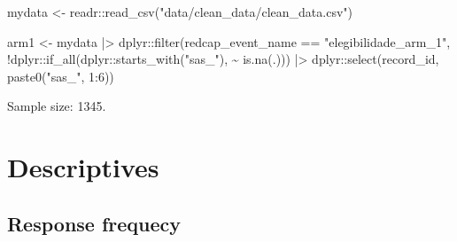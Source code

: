 \documentclass[
  letterpaper,
  DIV=11,
  numbers=noendperiod]{scrreprt}
\newenvironment{Shaded}{\begin{snugshade}}{\end{snugshade}}
\newcommand{\DecValTok}[1]{\textcolor[rgb]{0.68,0.00,0.00}{#1}}
\newcommand{\FunctionTok}[1]{\textcolor[rgb]{0.28,0.35,0.67}{#1}}
\newcommand{\NormalTok}[1]{\textcolor[rgb]{0.00,0.23,0.31}{#1}}
\newcommand{\OtherTok}[1]{\textcolor[rgb]{0.00,0.23,0.31}{#1}}
\newcommand{\SpecialCharTok}[1]{\textcolor[rgb]{0.37,0.37,0.37}{#1}}
\newcommand{\StringTok}[1]{\textcolor[rgb]{0.13,0.47,0.30}{#1}}
\begin{document}
\begin{Shaded}
\begin{Highlighting}[]
\NormalTok{mydata }\OtherTok{\textless{}{-}}\NormalTok{ readr}\SpecialCharTok{::}\FunctionTok{read\_csv}\NormalTok{(}\StringTok{"data/clean\_data/clean\_data.csv"}\NormalTok{)}

\NormalTok{arm1 }\OtherTok{\textless{}{-}}\NormalTok{ mydata }\SpecialCharTok{|\textgreater{}} 
\NormalTok{  dplyr}\SpecialCharTok{::}\FunctionTok{filter}\NormalTok{(redcap\_event\_name }\SpecialCharTok{==} \StringTok{"elegibilidade\_arm\_1"}\NormalTok{,}
                \SpecialCharTok{!}\NormalTok{dplyr}\SpecialCharTok{::}\FunctionTok{if\_all}\NormalTok{(dplyr}\SpecialCharTok{::}\FunctionTok{starts\_with}\NormalTok{(}\StringTok{"sas\_"}\NormalTok{), }\SpecialCharTok{\textasciitilde{}} \FunctionTok{is.na}\NormalTok{(.))) }\SpecialCharTok{|\textgreater{}} 
\NormalTok{  dplyr}\SpecialCharTok{::}\FunctionTok{select}\NormalTok{(record\_id, }\FunctionTok{paste0}\NormalTok{(}\StringTok{"sas\_"}\NormalTok{, }\DecValTok{1}\SpecialCharTok{:}\DecValTok{6}\NormalTok{))}
\end{Highlighting}
\end{Shaded}

Sample size: 1345.

\hypertarget{descriptives}{%
\section{Descriptives}\label{descriptives}}

\hypertarget{response-frequecy}{%
\subsection{Response frequecy}\label{response-frequecy}}
\end{document}
